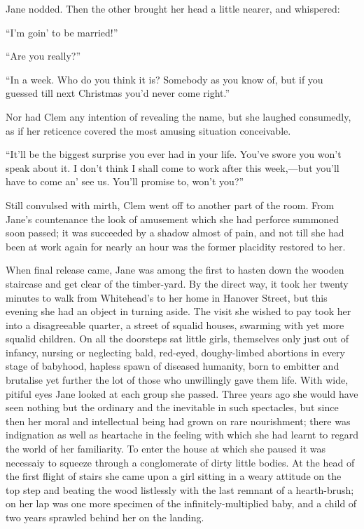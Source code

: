 {}Jane nodded. Then the other brought her head a little nearer, and
whispered:

``I'm goin' to be married!''

``Are you really?''

``In a week. Who do you think it is? Somebody as you know of, but if you
guessed till next Christmas you'd never come right.''

Nor had Clem any intention of revealing the name, but she laughed
consumedly, as if her reticence covered the most amusing situation
conceivable.

``It'll be the biggest surprise you ever had in your life. You've swore
you won't speak about it. I don't think I shall come to work after this
week,---but you'll have to come an' see us. You'll promise to, won't
you?''

Still convulsed with mirth, Clem went off to another part of the room.
From Jane's countenance the look of amusement which she had perforce
summoned soon passed; it was succeeded by a shadow almost of pain, and
not till she had been at work again for nearly an hour was the former
placidity restored to her.

{}When final release came, Jane was among the first to hasten down the
wooden staircase and get clear of the timber-yard. By the direct way, it
took her twenty minutes to walk from Whitehead's to her home in Hanover
Street, but this evening she had an object in turning aside. The visit
she wished to pay took her into a disagreeable quarter, a street of
squalid houses, swarming with yet more squalid children. On all the
doorsteps sat little girls, themselves only just out of infancy, nursing
or neglecting bald, red-eyed, doughy-limbed abortions in every stage of
babyhood, hapless spawn of diseased humanity, born to embitter and
brutalise yet further the lot of those who unwillingly gave them life.
With wide, pitiful eyes Jane looked at each group she passed. Three
years ago she would have seen nothing but the ordinary and the
inevitable in such spectacles, but since then her moral and intellectual
being had grown on rare nourishment; there was indignation as well as
heartache in the feeling with which she had learnt to regard the {}world
of her familiarity. To enter the house at which she paused it was
necessaiy to squeeze through a conglomerate of dirty little bodies. At
the head of the first flight of stairs she came upon a girl sitting in a
weary attitude on the top step and beating the wood listlessly with the
last remnant of a hearth-brush; on her lap was one more specimen of the
infinitely-multiplied baby, and a child of two years sprawled behind her
on the landing.


